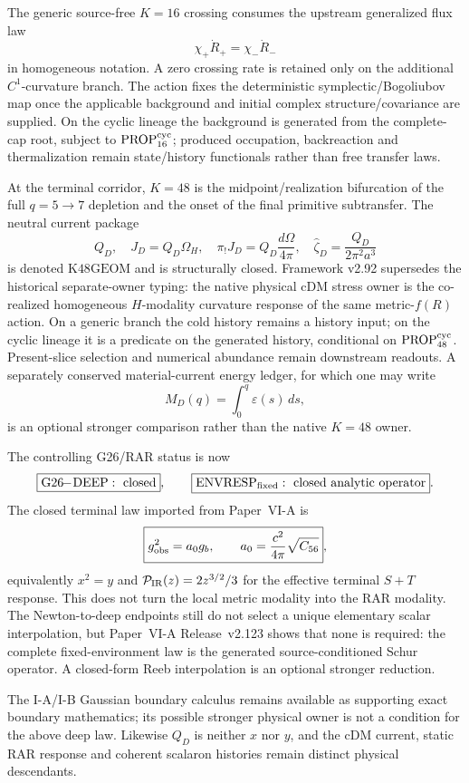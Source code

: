 \documentclass[12pt,a4paper]{article}
\begin{document}
The generic source-free $K=16$ crossing consumes the upstream generalized
flux law
\[
 \boxed{\chi_+\dot R_+=\chi_-\dot R_-}
\]
in homogeneous notation.  A zero crossing rate is retained only on the
additional $C^1$-curvature branch.  The action fixes the deterministic symplectic/Bogoliubov map once the
applicable background and initial complex structure/covariance are supplied.
On the cyclic lineage the background is generated from the complete-cap root,
subject to \(\mathrm{PROP}^{\rm cyc}_{16}\); produced occupation,
backreaction and thermalization remain state/history functionals rather than
free transfer laws.

At the terminal corridor, $K=48$ is the midpoint/realization bifurcation of the
full $q=5\to7$ depletion and the onset of the final primitive subtransfer.  The
neutral current package
\[
 Q_D,\quad J_D=Q_D\Omega_H,\quad
 \pi_!J_D=Q_D\frac{d\Omega}{4\pi},\quad
 \widehat\zeta_D=\frac{Q_D}{2\pi^2a^3}
\]
is denoted $\mathrm{K48GEOM}$ and is structurally closed.  Framework v2.92
supersedes the historical separate-owner typing: the native physical cDM stress
owner is the co-realized homogeneous $H$-modality curvature response of the
same metric-$f(R)$ action.  On a generic branch the cold history remains a
history input; on the cyclic lineage it is a predicate on the generated
history, conditional on \(\mathrm{PROP}^{\rm cyc}_{48}\).  Present-slice
selection and numerical abundance remain downstream readouts.  A separately conserved material-current energy ledger,
for which one may write
\[
 M_D(q)=\int_0^q\varepsilon(s)\,ds,
\]
is an optional stronger comparison rather than the native $K=48$ owner.

The controlling G26/RAR status is now
\[
 \boxed{\mathrm{G26\!\! -\! DEEP}:\ \text{closed}},
 \qquad
 \boxed{\mathrm{ENVRESP}_{\rm fixed}:\ \text{closed analytic operator}}.
\]
The closed terminal law imported from Paper~VI-A is
\[
 \boxed{g_{\rm obs}^2=a_0g_b,
 \qquad a_0=\frac{c^2}{4\pi}\sqrt{C_{56}}},
\]
equivalently $x^2=y$ and
$\mathcal P_{\rm IR}(z)=2z^{3/2}/3$ for the effective terminal $S+T$ response.
This does not turn the local metric modality into the RAR modality.  The
Newton-to-deep endpoints still do not select a unique elementary scalar
interpolation, but Paper~VI-A Release~v2.123 shows that none is required: the
complete fixed-environment law is the generated source-conditioned Schur
operator.  A closed-form Reeb interpolation is an optional stronger reduction.

The I-A/I-B Gaussian boundary calculus remains available as supporting exact
boundary mathematics; its possible stronger physical owner is not a condition
for the above deep law.  Likewise $Q_D$ is neither $x$ nor $y$, and the cDM
current, static RAR response and coherent scalaron histories remain distinct
physical descendants.
\end{document}
